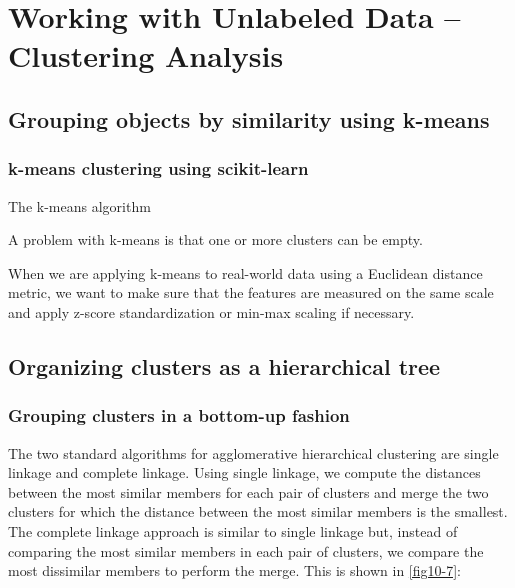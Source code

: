 \chapter{Working with Unlabeled Data – Clustering Analysis\label{Ch01}}
\section{Grouping objects by similarity using k-means}
\subsection{k-means clustering using scikit-learn}
\begin{algorithm}
    \caption{The k-means algorithm}
\end{algorithm}

A problem with k-means is that one or more clusters can be empty.
\begin{tcolorbox}[title=Feature scaling]
    When we are applying k-means to real-world data using a Euclidean distance metric, we want to make sure that the features are measured on the same scale and apply z-score standardization or min-max scaling if necessary.
\end{tcolorbox}

\section{Organizing clusters as a hierarchical tree}
\subsection{Grouping clusters in a bottom-up fashion}
The two standard algorithms for agglomerative hierarchical clustering are single linkage and complete linkage. Using single linkage, we compute the distances between the most similar members for each pair of clusters and merge the two clusters for which the distance between the most similar members is the smallest. The complete linkage approach is similar to single linkage but, instead of comparing the most similar members in each pair of clusters, we compare the most dissimilar members to perform the merge. This is shown in \autoref{fig10-7}:

